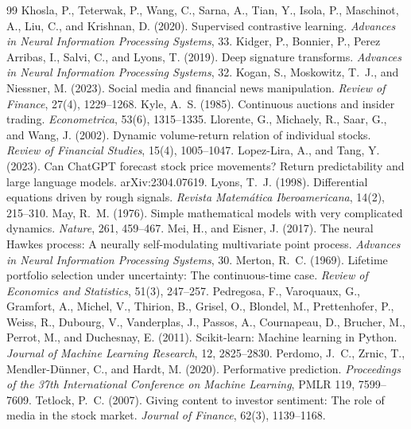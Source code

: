 \documentclass{article}
\theoremstyle{plain}
\theoremstyle{definition}
\theoremstyle{remark}
\begin{document}
{\begin{thebibliography}{99}
 Khosla, P., Teterwak, P., Wang, C., Sarna, A., Tian, Y., Isola, P., Maschinot, A., Liu, C., and Krishnan, D. (2020). Supervised contrastive learning. \emph{Advances in Neural Information Processing Systems}, 33.
 Kidger, P., Bonnier, P., Perez Arribas, I., Salvi, C., and Lyons, T. (2019). Deep signature transforms. \emph{Advances in Neural Information Processing Systems}, 32.
 Kogan, S., Moskowitz, T.~J., and Niessner, M. (2023). Social media and financial news manipulation. \emph{Review of Finance}, 27(4), 1229--1268.
 Kyle, A.~S. (1985). Continuous auctions and insider trading. \emph{Econometrica}, 53(6), 1315--1335.
 Llorente, G., Michaely, R., Saar, G., and Wang, J. (2002). Dynamic volume-return relation of individual stocks. \emph{Review of Financial Studies}, 15(4), 1005--1047.
 Lopez-Lira, A., and Tang, Y. (2023). Can ChatGPT forecast stock price movements? Return predictability and large language models. arXiv:2304.07619.
 Lyons, T.~J. (1998). Differential equations driven by rough signals. \emph{Revista Matem\'atica Iberoamericana}, 14(2), 215--310.
 May, R.~M. (1976). Simple mathematical models with very complicated dynamics. \emph{Nature}, 261, 459--467.
 Mei, H., and Eisner, J. (2017). The neural Hawkes process: A neurally self-modulating multivariate point process. \emph{Advances in Neural Information Processing Systems}, 30.
 Merton, R.~C. (1969). Lifetime portfolio selection under uncertainty: The continuous-time case. \emph{Review of Economics and Statistics}, 51(3), 247--257.
 Pedregosa, F., Varoquaux, G., Gramfort, A., Michel, V., Thirion, B., Grisel, O., Blondel, M., Prettenhofer, P., Weiss, R., Dubourg, V., Vanderplas, J., Passos, A., Cournapeau, D., Brucher, M., Perrot, M., and Duchesnay, E. (2011). Scikit-learn: Machine learning in Python. \emph{Journal of Machine Learning Research}, 12, 2825--2830.
 Perdomo, J.~C., Zrnic, T., Mendler-D\"unner, C., and Hardt, M. (2020). Performative prediction. \emph{Proceedings of the 37th International Conference on Machine Learning}, PMLR 119, 7599--7609.
 Tetlock, P.~C. (2007). Giving content to investor sentiment: The role of media in the stock market. \emph{Journal of Finance}, 62(3), 1139--1168.

\end{thebibliography}}
\end{document}
